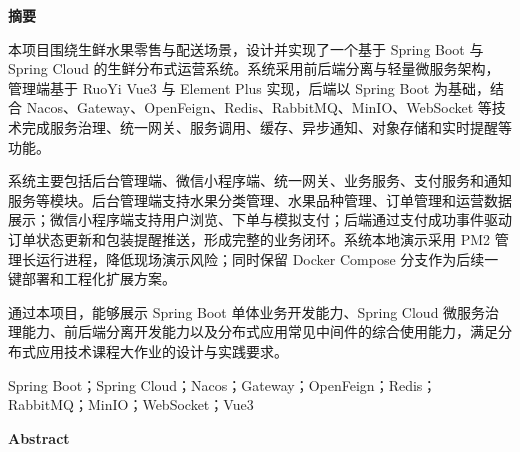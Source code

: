 
\clearpage
\thispagestyle{abstractcn}

\vspace*{1.15cm}

\begin{center}
  {\heiti\bfseries{} 摘\quad 要\par}
\end{center}

\vspace{0.25cm}

{\songti{}\setlength{\parindent}{2em}\linespread{1.65}\selectfont
本项目围绕生鲜水果零售与配送场景，设计并实现了一个基于 Spring Boot 与 Spring Cloud 的生鲜分布式运营系统。系统采用前后端分离与轻量微服务架构，管理端基于 RuoYi Vue3 与 Element Plus 实现，后端以 Spring Boot 为基础，结合 Nacos、Gateway、OpenFeign、Redis、RabbitMQ、MinIO、WebSocket 等技术完成服务治理、统一网关、服务调用、缓存、异步通知、对象存储和实时提醒等功能。

系统主要包括后台管理端、微信小程序端、统一网关、业务服务、支付服务和通知服务等模块。后台管理端支持水果分类管理、水果品种管理、订单管理和运营数据展示；微信小程序端支持用户浏览、下单与模拟支付；后端通过支付成功事件驱动订单状态更新和包装提醒推送，形成完整的业务闭环。系统本地演示采用 PM2 管理长运行进程，降低现场演示风险；同时保留 Docker Compose 分支作为后续一键部署和工程化扩展方案。

通过本项目，能够展示 Spring Boot 单体业务开发能力、Spring Cloud 微服务治理能力、前后端分离开发能力以及分布式应用常见中间件的综合使用能力，满足分布式应用技术课程大作业的设计与实践要求。

\vspace{0.65cm}
Spring Boot；Spring Cloud；Nacos；Gateway；OpenFeign；Redis；RabbitMQ；MinIO；WebSocket；Vue3
\par}

\clearpage
\thispagestyle{abstracten}

\vspace*{0.9cm}

\begin{center}
  {\rmfamily\bfseries{} Abstract\par}
\end{center}

\vspace{0.15cm}

